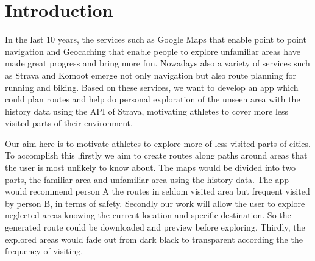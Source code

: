 \documentclass{sigchi}
\begin{document}

\section{Introduction}
In the last 10 years, the services such as Google Maps that enable point to point navigation and  Geocaching that enable people to explore unfamiliar areas have made great progress and bring more fun. Nowadays also a variety of services such as Strava and Komoot emerge not only navigation but also route planning for running and biking. Based on these services, we want to develop an app which could plan routes and help do personal exploration of the unseen area with the history data using the API of Strava, motivating athletes to cover more less visited parts of their environment.

Our aim here is to motivate athletes to explore more of less visited parts of cities. To accomplish this ,firstly we aim to create routes along paths around areas that the user is most unlikely to know about. The maps would be divided into two parts, the familiar area and unfamiliar area using the history data. The app would recommend person A the routes in seldom visited area but frequent visited by person B, in terms of safety. Secondly our work will allow the user to explore neglected areas knowing the current location and specific destination. So the generated route could be downloaded and preview before exploring. Thirdly, the explored areas would fade out from dark black to transparent according the the frequency of visiting.
\end{document}
